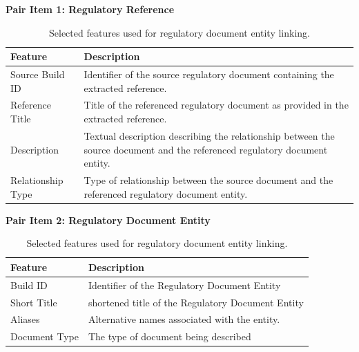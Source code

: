 \begin{table}[ht]
\centering
\caption{Selected features used for regulatory document entity linking.}
\label{tab:selected_features}

\textbf{Pair Item 1: Regulatory Reference}

\begin{tabular}{p{4cm} p{8cm}}
\hline
\textbf{Feature} & \textbf{Description} \\
\hline
Source Build ID & Identifier of the source regulatory document containing the extracted reference. \\

Reference Title & Title of the referenced regulatory document as provided in the extracted reference. \\

Description & Textual description describing the relationship between the source document and the referenced regulatory document entity. \\

Relationship Type & Type of relationship between the source document and the referenced regulatory document entity. \\
\hline
\end{tabular}

\vspace{1cm}

\textbf{Pair Item 2: Regulatory Document Entity}

\begin{tabular}{p{4cm} p{8cm}}
\hline
\textbf{Feature} & \textbf{Description} \\
\hline
Build ID & Identifier of the Regulatory Document Entity \\
Short Title & shortened title of the Regulatory Document Entity \\
Aliases & Alternative names associated with the entity. \\
Document Type & The type of document being described \\
\hline
\end{tabular}
\end{table}